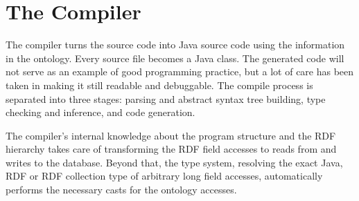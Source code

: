\newcommand{\caret}{{\large\textbf{\textasciicircum}}}

\section{The \vonda Compiler}

The compiler turns the \vonda source code into Java source code using the information
in the ontology. Every source file becomes a Java class. The generated code
will not serve as an example of good programming practice, but a lot of care
has been taken in making it still readable and debuggable. The
compile process is separated into three stages: parsing and abstract syntax tree building,
type checking and inference, and code generation.

The \vonda compiler's internal knowledge about the program structure and the
RDF hierarchy takes care of transforming the RDF field accesses to reads from and
writes to the database. Beyond that, the type system, resolving the exact
Java, RDF or RDF collection type of arbitrary long field accesses, automatically
performs the necessary casts for the ontology accesses.

%
%
%
%

